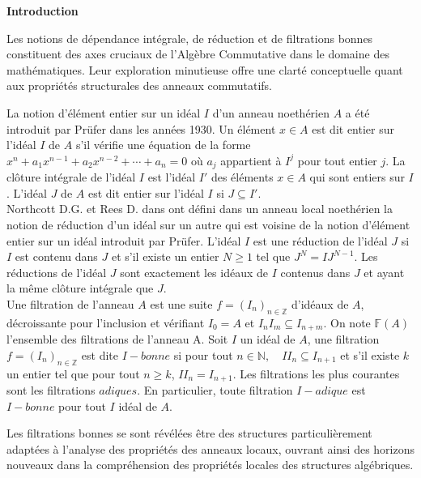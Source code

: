 \newpage
\tableofcontents
\renewcommand{\contentsname}{Table des matières}
\thispagestyle{empty}

\newpage

\setcounter{page}{0} 
\thispagestyle{empty}
\begin{center}
	\LARGE{\textbf{Introduction}}
\end{center}
\vspace{1cm}

Les notions de dépendance intégrale, de réduction et de filtrations bonnes constituent des axes cruciaux de l'Algèbre Commutative dans le domaine des mathématiques. Leur exploration minutieuse offre une clarté conceptuelle quant aux propriétés structurales des anneaux commutatifs.

La notion d'élément entier sur un idéal $I$ d'un anneau noethérien $A$ a été introduit par Prüfer \cite{Pr} dans les années 1930. Un élément $x \in A $ est dit entier sur l'idéal $I$ de $A$ s'il vérifie une équation de la forme $x^n + a_1 x^{n-1} +a_2 x^{n-2}+ \cdots + a_n = 0$ où $a_j$ appartient à $I^j$ pour tout entier $j$. La clôture intégrale de l'idéal $I$ est l'idéal $I'$ des éléments $x \in A$ qui sont entiers sur $I$. L'idéal $J$ de $A$ est dit entier sur l'idéal $I$ si $J \subseteq I'$.\\ Northcott D.G. et Rees D. dans \cite{No} ont défini dans un anneau local noethérien la notion de réduction d'un idéal sur un autre qui est voisine de la notion d'élément entier sur un idéal introduit par Prüfer. L'idéal $I$ est une réduction de l'idéal $J$ si $I$ est contenu dans $J$ et s'il existe un entier $N \geqslant 1$ tel que $J^N = IJ^{N-1}$. Les réductions de l'idéal $J$ sont exactement les idéaux de $I$ contenus dans $J$ et ayant la même clôture intégrale que $J$.\\
Une filtration de l'anneau $A$ est une suite $f=(I_n)_{n \in \mathbb{Z}}$ d'idéaux de $A$, décroissante pour l'inclusion et vérifiant $I_0 = A$ et $I_n I_m \subseteq I_{n+m}$. On note $\mathbb{F}(A)$ l'ensemble des filtrations de l'anneau A. Soit $I$ un idéal de $A$, une filtration $f=(I_n)_{n \in \mathbb{Z}}$ est dite $I-bonne$ si pour tout $n \in \mathbb{N}, \quad II_n \subseteq I_{n+1}$ et s'il existe $k$ un entier tel que pour tout $n \geqslant k$, $II_n = I_{n+1}$. Les filtrations les plus courantes sont les filtrations $adiques$. En particulier, toute filtration $I-adique$ est $I-bonne$ pour tout $I$ idéal de $A$.

Les filtrations bonnes se sont révélées être des structures particulièrement adaptées à l'analyse des propriétés des anneaux locaux, ouvrant ainsi des horizons nouveaux dans la compréhension des propriétés locales des structures algébriques.

